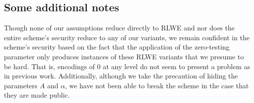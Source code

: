 \subsection{Some additional notes}

Though none of our assumptions reduce directly to RLWE and nor does the entire scheme's security reduce to any of our variants, we remain confident in the scheme's security based on the fact that the application of the zero-testing parameter only produces instances of these RLWE variants that we presume to be hard.  That is, encodings of $0$ at any level do not seem to present a problem as in previous work.  Additionally, although we take the precaution of hiding the parameters $A$ and $\alpha$, we have not been able to break the scheme in the case that they are made public. 
